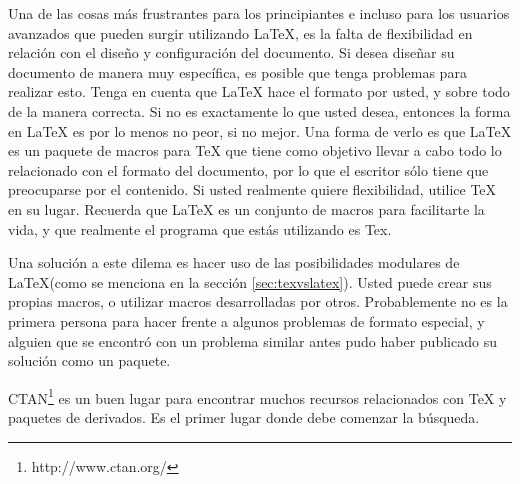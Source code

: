 \documentclass[paper,11pt]{article}
\begin{document}
Una de las cosas más frustrantes para los principiantes e incluso para los usuarios avanzados que pueden surgir utilizando \LaTeX, es la falta de flexibilidad en relación con el diseño y configuración del documento. Si desea diseñar su documento de manera muy específica, es posible que tenga problemas para realizar esto. Tenga en cuenta que LaTeX hace el formato por usted, y sobre todo de la manera correcta. Si no es exactamente lo que usted desea, entonces la forma en LaTeX es por lo menos no peor, si no mejor. Una forma de verlo es que LaTeX es un paquete de macros para TeX que tiene como objetivo llevar a cabo todo lo relacionado con el formato del documento, por lo que el escritor sólo tiene que preocuparse por el contenido. Si usted realmente quiere flexibilidad, utilice TeX en su lugar. Recuerda que LaTeX es un conjunto de macros para facilitarte la vida, y que realmente el programa que estás utilizando es Tex.

Una solución a este dilema es hacer uso de las posibilidades modulares de \LaTeX (como se menciona en la sección \ref{sec:texvslatex}). Usted puede crear sus propias macros, o utilizar macros desarrolladas por otros. Probablemente no es la primera persona para hacer frente a algunos problemas de formato especial, y alguien que se encontró con un problema similar antes pudo haber publicado su solución como un paquete.

CTAN\footnote{http://www.ctan.org/} es un buen lugar para encontrar muchos recursos relacionados con TeX y paquetes de derivados. Es el primer lugar donde debe comenzar la búsqueda.
\end{document}
